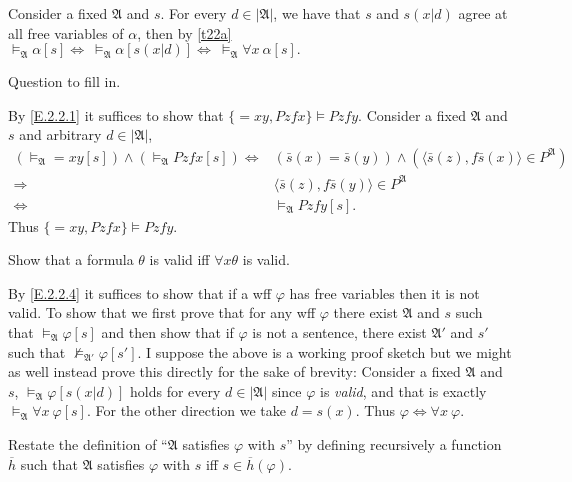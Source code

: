 Consider a fixed $\mathfrak{A}$ and $s$. For every $d\in|\mathfrak{A}|$, we have that $s$ and $s(x|d)$ agree at all free variables of $\alpha$, then by \ref{t22a} $\vDash_{\mathfrak{A}}\alpha[s]\Leftrightarrow\ \vDash_{\mathfrak{A}}\alpha[s(x|d)]\Leftrightarrow\ \vDash_{\mathfrak{A}}\forall x\ \alpha[s].$

\begin{exercise}
  Question to fill in.
\end{exercise}

By \ref{E.2.2.1} it suffices to show that $\{=xy, Pzfx\}\vDash Pzfy$. Consider a fixed $\mathfrak{A}$ and $s$ and arbitrary $d\in|\mathfrak{A}|$,
\begin{align*}
  (\vDash_{\mathfrak{A}}=xy[s])\wedge(\vDash_{\mathfrak{A}}Pzfx[s])
  \Leftrightarrow & (\bar{s}(x)=\bar{s}(y))\wedge(\langle\bar{s}(z),f\bar{s}(x)\rangle\in P^{\mathfrak{A}}) \\
  \Rightarrow     & \langle\bar{s}(z),f\bar{s}(y)\rangle\in P^{\mathfrak{A}}                                \\
  \Leftrightarrow & \vDash_{\mathfrak{A}}Pzfy[s].
\end{align*}
Thus $\{=xy, Pzfx\}\vDash Pzfy$.

\begin{exercise}
  Show that a formula $\theta$ is valid iff $\forall x\theta$ is valid.
\end{exercise}

By \ref{E.2.2.4} it suffices to show that if a wff $\varphi$ has free variables then it is not valid. To show that we first prove that for any wff $\varphi$ there exist $\mathfrak{A}$ and $s$ such that $\vDash_{\mathfrak{A}}\varphi[s]$ and then show that if $\varphi$ is not a sentence, there exist $\mathfrak{A}'$ and $s'$ such that $\nvDash_{\mathfrak{A}'}\varphi[s']$. I suppose the above is a working proof sketch but we might as well instead prove this directly for the sake of brevity: Consider a fixed $\mathfrak{A}$ and $s$, $\vDash_{\mathfrak{A}}\varphi[s(x|d)]$ holds for every $d\in|\mathfrak{A}|$ since $\varphi$ is \textit{valid}, and that is exactly $\vDash_{\mathfrak{A}}\forall x\ \varphi[s]$. For the other direction we take $d=s(x)$. Thus $\varphi \Leftrightarrow\forall x\ \varphi$.

\begin{exercise}
  Restate the definition of ``$\mathfrak{A}$ satisfies $\varphi$ with $s$'' by defining recursively a function $\overline{h}$ such that $\mathfrak{A}$ satisfies $\varphi$ with $s$ iff $s\in \overline{h}(\varphi).$
\end{exercise}

